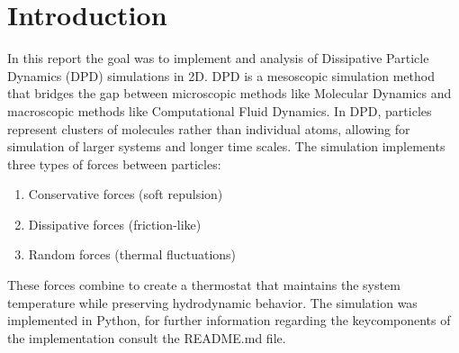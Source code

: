 \section*{Introduction}
In this report the goal was to implement and analysis of Dissipative Particle Dynamics (DPD) simulations in 2D. DPD is a mesoscopic simulation method that bridges the gap between microscopic methods like Molecular Dynamics and macroscopic methods like Computational Fluid Dynamics. In DPD, particles represent clusters of molecules rather than individual atoms, allowing for simulation of larger systems and longer time scales.
The simulation implements three types of forces between particles:
\begin{enumerate}
	\item Conservative forces (soft repulsion)
	\item Dissipative forces (friction-like)
	\item Random forces (thermal fluctuations)
\end{enumerate}
These forces combine to create a thermostat that maintains the system temperature while preserving hydrodynamic behavior.
The simulation was implemented in Python, for further information regarding the keycomponents of the implementation consult the README.md file.
